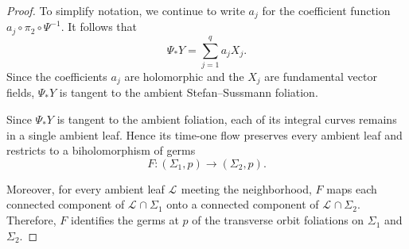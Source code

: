 \documentclass[10pt,a4paper]{amsart}
\newcommand{\leaf}[1]{\mathcal{L}_{#1}}
\begin{document}
\begin{proof}
 

To simplify notation, we continue to write $a_j$ for the coefficient
function $a_j\circ\pi_2\circ\Psi^{-1}$. It follows that
\[
    \Psi_*Y=\sum_{j=1}^q a_jX_j.
\]
Since the coefficients $a_j$ are holomorphic and the $X_j$ are
fundamental vector fields, $\Psi_*Y$ is tangent to the ambient
Stefan--Sussmann foliation.

	
Since $\Psi_*Y$ is tangent to the ambient foliation, each of its
integral curves remains in a single ambient leaf. Hence its time-one
flow preserves every ambient leaf and restricts to a biholomorphism of
germs
\[
    F:(\Sigma_1,p)\longrightarrow(\Sigma_2,p).
\]

Moreover, for every ambient leaf $\leaf{}$ meeting the neighborhood,
$F$ maps each connected component of $\leaf{}\cap\Sigma_1$ onto a
connected component of $\leaf{}\cap\Sigma_2$. Therefore, $F$ identifies
the germs at $p$ of the transverse orbit foliations on $\Sigma_1$ and
$\Sigma_2$.	
\end{proof}
\end{document}
